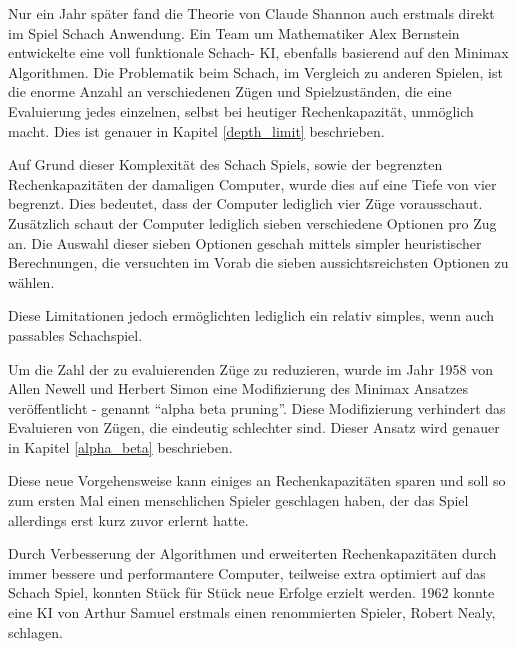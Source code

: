 
Nur ein Jahr später fand die Theorie von Claude Shannon auch erstmals direkt im Spiel Schach Anwendung. Ein Team um Mathematiker Alex Bernstein entwickelte eine voll funktionale Schach- KI, ebenfalls basierend auf den Minimax Algorithmen. \cite{Kurenkov2019} Die Problematik beim Schach, im Vergleich zu anderen Spielen, ist die enorme Anzahl an verschiedenen Zügen und Spielzuständen, die eine Evaluierung jedes einzelnen, selbst bei heutiger Rechenkapazität, unmöglich macht. Dies ist genauer in Kapitel \ref{depth_limit} beschrieben. 

Auf Grund dieser Komplexität des Schach Spiels, sowie der begrenzten Rechenkapazitäten der damaligen Computer, wurde dies auf eine Tiefe von vier begrenzt. Dies bedeutet, dass der Computer lediglich vier Züge vorausschaut. Zusätzlich schaut der Computer lediglich sieben verschiedene Optionen pro Zug an. Die Auswahl dieser sieben Optionen geschah mittels simpler heuristischer Berechnungen, die versuchten im Vorab die sieben aussichtsreichsten Optionen zu wählen. \cite{Bernstein1958}


Diese Limitationen jedoch ermöglichten lediglich ein relativ simples, wenn auch passables Schachspiel.


Um die Zahl der zu evaluierenden Züge zu reduzieren, wurde im Jahr 1958 von Allen Newell und Herbert Simon eine Modifizierung des Minimax Ansatzes veröffentlicht - genannt ``alpha beta pruning''. Diese Modifizierung verhindert das Evaluieren von Zügen, die eindeutig schlechter sind. Dieser Ansatz wird genauer in Kapitel \ref{alpha_beta} beschrieben. \cite{Newell2010}


Diese neue Vorgehensweise kann einiges an Rechenkapazitäten sparen und soll so zum ersten Mal einen menschlichen Spieler geschlagen haben, der das Spiel allerdings erst kurz zuvor erlernt hatte. \cite{Kurenkov2019}

Durch Verbesserung der Algorithmen und erweiterten Rechenkapazitäten durch immer bessere und performantere Computer, teilweise extra optimiert auf das Schach Spiel, konnten Stück für Stück neue Erfolge erzielt werden. 1962 konnte eine KI von Arthur Samuel erstmals einen renommierten Spieler, Robert Nealy, schlagen. \cite{Kurenkov2019}

